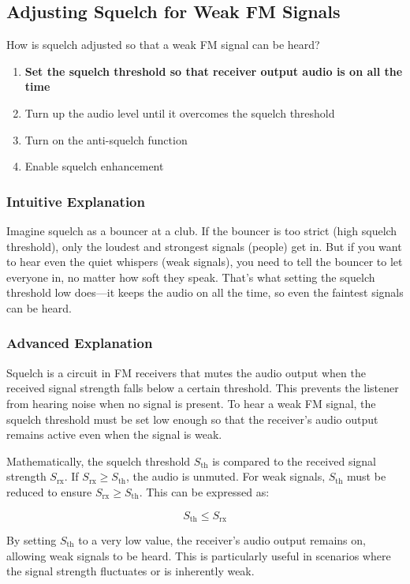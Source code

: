 \subsection{Adjusting Squelch for Weak FM Signals}
\label{T4B03}

\begin{tcolorbox}[colback=gray!10!white,colframe=black!75!black,title=T4B03]
How is squelch adjusted so that a weak FM signal can be heard?
\begin{enumerate}[label=\Alph*)]
    \item \textbf{Set the squelch threshold so that receiver output audio is on all the time}
    \item Turn up the audio level until it overcomes the squelch threshold
    \item Turn on the anti-squelch function
    \item Enable squelch enhancement
\end{enumerate}
\end{tcolorbox}

\subsubsection{Intuitive Explanation}
Imagine squelch as a bouncer at a club. If the bouncer is too strict (high squelch threshold), only the loudest and strongest signals (people) get in. But if you want to hear even the quiet whispers (weak signals), you need to tell the bouncer to let everyone in, no matter how soft they speak. That’s what setting the squelch threshold low does—it keeps the audio on all the time, so even the faintest signals can be heard.

\subsubsection{Advanced Explanation}
Squelch is a circuit in FM receivers that mutes the audio output when the received signal strength falls below a certain threshold. This prevents the listener from hearing noise when no signal is present. To hear a weak FM signal, the squelch threshold must be set low enough so that the receiver’s audio output remains active even when the signal is weak. 

Mathematically, the squelch threshold \( S_{\text{th}} \) is compared to the received signal strength \( S_{\text{rx}} \). If \( S_{\text{rx}} \geq S_{\text{th}} \), the audio is unmuted. For weak signals, \( S_{\text{th}} \) must be reduced to ensure \( S_{\text{rx}} \geq S_{\text{th}} \). This can be expressed as:

\[ S_{\text{th}} \leq S_{\text{rx}} \]

By setting \( S_{\text{th}} \) to a very low value, the receiver’s audio output remains on, allowing weak signals to be heard. This is particularly useful in scenarios where the signal strength fluctuates or is inherently weak.

